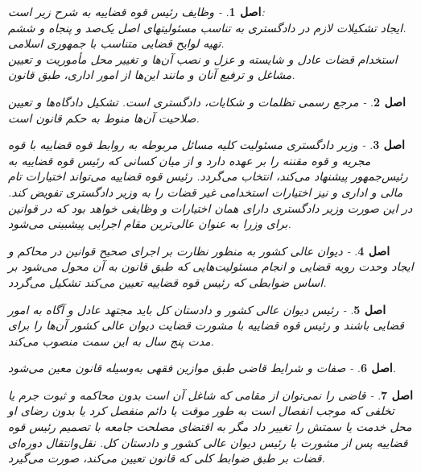 \documentclass[12pt]{article}
\newtheorem{asl}{اصل}
\begin{document}
\begin{asl}- 
وظایف رئیس قوه قضاییه به شرح زیر است: 
\\
ایجاد تشکیلات لازم در دادگستری به تناسب مسئولیت‏های اصل یک‌صد و پنجاه و ششم. 
\\
تهیه لوایح قضایی متناسب با جمهوری اسلامی. 
\\
استخدام قضات عادل و شایسته و عزل و نصب آن‌ها و تغییر محل مأموریت و تعیین مشاغل و ترفیع آنان و مانند این‌ها از امور اداری، طبق قانون. 
 
\end{asl}

\begin{asl}- 
مرجع رسمی تظلمات و شکایات، دادگستری است. تشکیل دادگاه‌ها و تعیین صلاحیت آن‌ها منوط به حکم قانون است.  
\end{asl}

\begin{asl}- 
وزیر دادگستری مسئولیت کلیه مسائل مربوطه به روابط قوه قضاییه با قوه مجریه و قوه مقننه را بر عهده دارد و از میان کسانی که رئیس قوه قضاییه به رئیس‌جمهور پیشنهاد می‌کند، انتخاب می‌گردد. 
رئیس قوه قضاییه می‌تواند اختیارات تام مالی و اداری و نیز اختیارات استخدامی غیر قضات را به وزیر دادگستری تفویض کند. در این صورت وزیر دادگستری دارای همان اختیارات و وظایفی خواهد بود که در قوانین برای وزرا به عنوان عالی‌ترین مقام اجرایی پیش‏بینی می‌شود. 
\end{asl}

\begin{asl}- 
دیوان عالی کشور به منظور نظارت بر اجرای صحیح قوانین در محاکم و ایجاد وحدت رویه قضایی و انجام مسئولیت‌هایی که طبق قانون به آن محول می‌شود بر اساس ضوابطی که رئیس قوه قضاییه تعیین می‌کند تشکیل می‌گردد. 
\end{asl}

\begin{asl}- 
رئیس دیوان عالی کشور و دادستان کل باید مجتهد عادل و آگاه به امور قضایی باشند و رئیس قوه قضاییه با مشورت قضایت دیوان عالی کشور آن‌ها را برای مدت پنج سال به این سمت منصوب می‌کند. 
\end{asl}

\begin{asl}- 
صفات و شرایط قاضی طبق موازین فقهی به‌وسیله قانون معین می‌شود.  
\end{asl}

\begin{asl}- 
قاضی را نمی‌توان از مقامی که شاغل آن است بدون محاکمه و ثبوت جرم یا تخلفی که موجب انفصال است به طور موقت یا دائم منفصل کرد یا بدون رضای او محل خدمت یا سمتش را تغییر داد مگر به اقتضای مصلحت جامعه با تصمیم رئیس قوه قضاییه پس از مشورت با رئیس دیوان عالی کشور و دادستان کل. نقل‌وانتقال دوره‌ای قضات بر طبق ضوابط کلی که قانون تعیین می‌کند، صورت می‌گیرد. 
\end{asl}
\end{document}
